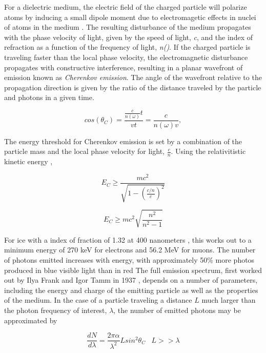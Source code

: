For a dielectric medium, the electric field of the charged particle will polarize atoms by inducing a small dipole moment due to electromagetic effects in nuclei of atoms in the medium \cite{Griffiths-EM}.
The resulting disturbance of the medium propagates with the phase velocity of light, given by the speed of light, \textit{c}, and the index of refraction as a function of the frequency of light, \textit{n(\omega)}.
If the charged particle is traveling faster than the local phase velocity, the electromagnetic disturbance propagates with constructive interference, resulting in a planar wavefront of emission known as \emph{Cherenkov emission}.
The angle of the wavefront relative to the propagation direction is given by the ratio of the distance traveled by the particle and photons in a given time.

\begin{equation}
cos(\theta_C) = \frac{\frac{c}{n(\omega)} t}{v t} = \frac{c}{n(\omega) v},
\end{equation} 

The energy threshold for Cherenkov emission is set by a combination of the particle mass and the local phase velocity for light, $\frac{c}{n}$.
Using the relativitistic kinetic energy \cite{Tavernier-Particles},

\begin{equation}
E_{C} \geq \frac{mc^2}{\sqrt{1-\left(\frac{c/n}{c}\right)^2}}
\end{equation}

\begin{equation}
E_{C} \geq mc^2\sqrt{\frac{n^2}{n^2-1}}
\end{equation}

For ice with a index of fraction of 1.32 at 400 nanometers \cite{ChinesePhysC-2014}, this works out to a minimum energy of 270 keV for electrons and 56.2 MeV for muons.
The number of photons emitted increases with energy, with approximately 50\% more photos produced in blue visible light than in red\cite{Tavernier-Particles}
The full emission spectrum, first worked out by Ilya Frank and Igor Tamm in 1937 \cite{Frank-Tamm}, depends on a number of parameters, including the energy and charge of the emitting particle as well as the properties of the medium.
In the case of a particle traveling a distance $L$ much larger than the photon frequency of interest, $\lambda$, the number of emitted photons may be approximated by

\begin{equation}
\frac{dN}{d\lambda}=\frac{2\pi \alpha}{\lambda^2}Lsin^2\theta_C \;\;\; L >> \lambda
\end{equation}

